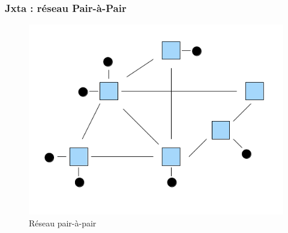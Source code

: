    \begin{frame}
      \frametitle{Jxta : réseau Pair-à-Pair}
      	\begin{figure}
			\includegraphics[scale=0.3]{includes/network-model.png}
			\caption{Réseau pair-à-pair}
	   	\end{figure}
    \end{frame}

